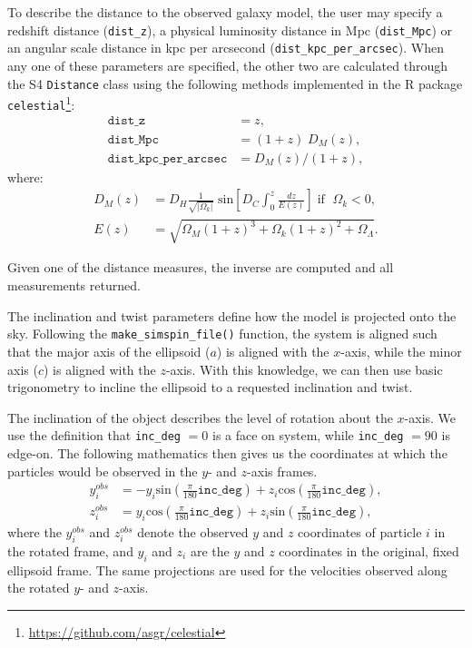 \documentclass[
  journal=pasa,
  manuscript=research-paper, %
  year=2020,
  volume=37,
]{cup-journal}
\newcommand{\makesimspinfile}[1]{\texttt{make\_simspin\_file()}#1}
\begin{document}
To describe the distance to the observed galaxy model, the user may specify a redshift distance (\texttt{dist\_z}), a physical luminosity distance in Mpc (\texttt{dist\_Mpc}) or an angular scale distance in kpc per arcsecond (\texttt{dist\_kpc\_per\_arcsec}).
When any one of these parameters are specified, the other two are calculated through the S4 \texttt{Distance} class using the following methods \citep{Hogg1999DistanceCosmology} implemented in the \small{R} package \texttt{celestial}\footnote{\url{https://github.com/asgr/celestial}}:
\begin{align}
    \texttt{dist\_z} &= z, \\
    \texttt{dist\_Mpc} &= (1 + z) \; D_{M}(z), \\
    \texttt{dist\_kpc\_per\_arcsec} &= D_{M}(z) / (1 + z), 
\end{align}
where:
\begin{align}
    D_{M}(z)&= D_{H} \frac{1}{\sqrt{|\Omega_k|}} \; \text{sin}\left[D_C \int^z_0 \frac{dz}{E(z)}\right] \; \text{if } \; \Omega_{k} < 0, \\
    E(z) &= \sqrt{\Omega_{M} (1 + z)^3 + \Omega_k (1+z)^2 + \Omega_\Lambda}. 
\end{align}

Given one of the distance measures, the inverse are computed and all measurements returned. 

The inclination and twist parameters define how the model is projected onto the sky. 
Following the \makesimspinfile{} function, the system is aligned such that the major axis of the ellipsoid ($a$) is aligned with the $x$-axis, while the minor axis ($c$) is aligned with the $z$-axis. 
With this knowledge, we can then use basic trigonometry to incline the ellipsoid to a requested inclination and twist.

The inclination of the object describes the level of rotation about the $x$-axis. 
We use the definition that \texttt{inc\_deg} $= 0$ is a face on system, while \texttt{inc\_deg} $= 90$ is edge-on. 
The following mathematics then gives us the coordinates at which the particles would be observed in the $y$- and $z$-axis frames. 
\begin{align} \label{eqn:inc1}
    y^{obs}_i &= - y_i \text{sin}(\frac{\pi}{180} \texttt{inc\_deg}) + z_i  \text{cos}(\frac{\pi}{180} \texttt{inc\_deg}), \\
    z^{obs}_i &= y_i \text{cos}(\frac{\pi}{180} \texttt{inc\_deg}) + z_i \text{sin}(\frac{\pi}{180} \texttt{inc\_deg}), \label{eqn:inc2}
\end{align}
where the $y^{obs}_i$ and $z^{obs}_i$ denote the observed $y$ and $z$ coordinates of particle $i$ in the rotated frame, and $y_i$ and $z_i$ are the $y$ and $z$ coordinates in the original, fixed ellipsoid frame. 
The same projections are used for the velocities observed along the rotated $y$- and $z$-axis.
\end{document}
